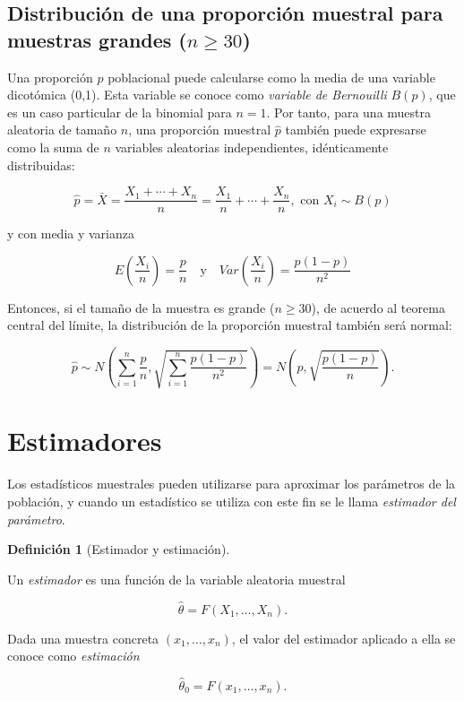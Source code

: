 \documentclass[
  a4paper,
]{scrreport}
\theoremstyle{plain}
\theoremstyle{definition}
\newtheorem{definition}{Definición}[chapter]
\theoremstyle{definition}
\theoremstyle{remark}
\begin{document}
\subsection{\texorpdfstring{Distribución de una proporción muestral para
muestras grandes
(\(n\geq 30\))}{Distribución de una proporción muestral para muestras grandes (n\textbackslash geq 30)}}\label{distribuciuxf3n-de-una-proporciuxf3n-muestral-para-muestras-grandes-ngeq-30}

Una proporción \(p\) poblacional puede calcularse como la media de una
variable dicotómica (0,1). Esta variable se conoce como \emph{variable
de Bernouilli} \(B(p)\), que es un caso particular de la binomial para
\(n=1\). Por tanto, para una muestra aleatoria de tamaño \(n\), una
proporción muestral \(\hat p\) también puede expresarse como la suma de
\(n\) variables aleatorias independientes, idénticamente distribuidas:

\[
\hat p = \bar X = \frac{X_1+\cdots+X_n}{n} = \frac{X_1}{n}+\cdots+\frac{X_n}{n}, \mbox{ con } X_i\sim B(p)
\]

y con media y varianza

\[
E\left(\frac{X_i}{n}\right) =\frac{p}{n} \quad  \mbox{y} \quad Var\left(\frac{X_i}{n}\right) = \frac{p(1-p)}{n^2}
\]

Entonces, si el tamaño de la muestra es grande (\(n\geq 30\)), de
acuerdo al teorema central del límite, la distribución de la proporción
muestral también será normal:

\[
\hat p \sim N\left(\sum_{i=1}^n \frac{p}{n},\sqrt{\sum_{i=1}^n \frac{p(1-p)}{n^2}} \right) = N\left(p,\sqrt{\frac{p(1-p)}{n}} \right).
\]

\section{Estimadores}\label{estimadores}

Los estadísticos muestrales pueden utilizarse para aproximar los
parámetros de la población, y cuando un estadístico se utiliza con este
fin se le llama \emph{estimador del parámetro}.

\begin{definition}[Estimador y
estimación]\protect\hypertarget{def-estimador-estimacion}{}\label{def-estimador-estimacion}

Un \emph{estimador} es una función de la variable aleatoria muestral

\[
\hat \theta = F(X_1,\ldots,X_n).
\]

Dada una muestra concreta \((x_1,\ldots,x_n)\), el valor del estimador
aplicado a ella se conoce como \emph{estimación}

\[
\hat \theta_0 = F(x_1,\ldots,x_n).
\]

\end{definition}
\end{document}
